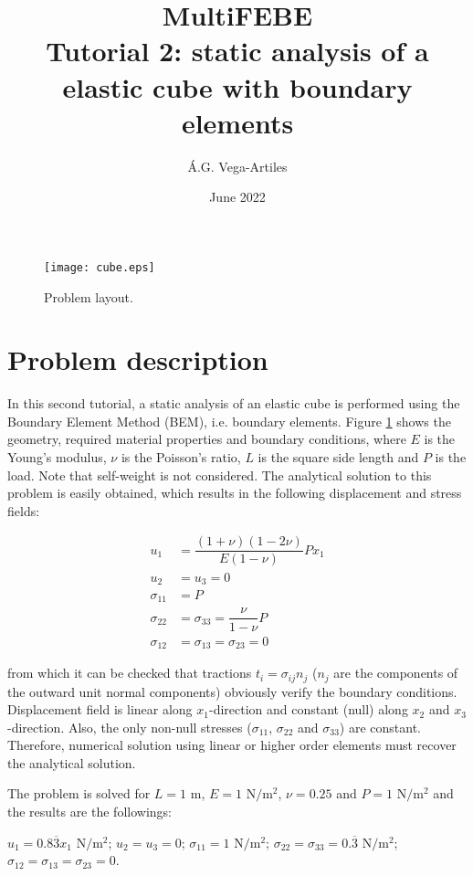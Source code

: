 \documentclass[a4]{article}
\title{MultiFEBE \\ Tutorial 2: static analysis of a elastic cube with boundary elements}
\author{\'A.G. Vega-Artiles}
\date{June 2022}
\begin{document}
\maketitle

\begin{figure}[h]
	\centering
	\texttt{[image: cube.eps]}
	\caption{Problem layout.}
	\label{fig:layout}
\end{figure}

\section{Problem description}

In this second tutorial, a static analysis of an elastic cube is performed using the Boundary Element Method (BEM), i.e. boundary elements. Figure \ref{fig:layout} shows the geometry, required material properties and boundary conditions, where $E$ is the Young's modulus, $\nu$ is the Poisson's ratio, $L$ is the square side length and $P$ is the load. Note that self-weight is not considered. The analytical solution to this problem is easily obtained, which results in the following displacement and stress fields:

\begin{align}
u_1 &= \dfrac{(1+\nu)(1-2\nu)}{E(1-\nu)} P x_1 \\
u_2 &= u_3 = 0 \\
\sigma_{11} &= P \\
\sigma_{22} &= \sigma_{33} = \dfrac{\nu}{1-\nu}P \\
\sigma_{12} &= \sigma_{13} = \sigma_{23}= 0
\end{align}

from which it can be checked that tractions $t_i=\sigma_{ij}n_j$ ($n_j$ are the components of the outward unit normal components) obviously verify the boundary conditions. Displacement field is linear along $x_1$-direction and constant (null) along $x_2$ and $x_3$-direction. Also, the only non-null stresses ($\sigma_{11}$, $\sigma_{22}$ and $\sigma_{33}$) are constant. Therefore, numerical solution using linear or higher order elements must recover the analytical solution.

The problem is solved for $L=1$ $\mathrm{m}$, $E=1$ $\mathrm{N/m^2}$, $\nu=0.25$  and $P=1$ $\mathrm{N/m^2}$ and the results are the followings:

	$u_1 = 0.8\overline{3} x_1$ $\mathrm{N/m^2}$;
	$u_2 = u_3 = 0$;
	$\sigma_{11} = 1$ $\mathrm{N/m^2}$;
	$\sigma_{22} = \sigma_{33} = 0.\overline{3}$ $\mathrm{N/m^2}$;
	$\sigma_{12} = \sigma_{13} = \sigma_{23} = 0$.
\end{document}
